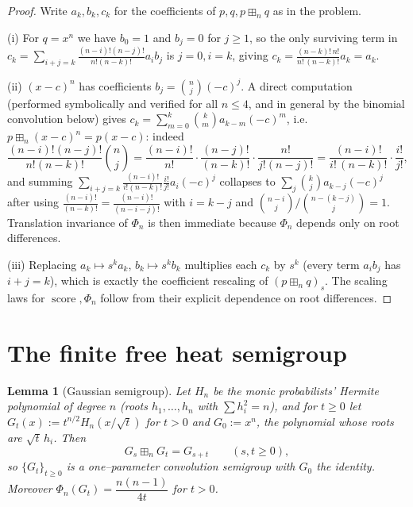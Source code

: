\documentclass[12pt]{article}
\newtheorem{lemma}{Lemma}
\theoremstyle{remark}
\DeclareMathOperator{\score}{score}
\newcommand{\boxp}{\boxplus_n}
\begin{document}
\begin{proof}
Write $a_k,b_k,c_k$ for the coefficients of $p,q,p\boxp q$ as in the problem.

(i) For $q=x^n$ we have $b_0=1$ and $b_j=0$ for $j\ge1$, so the only surviving
term in $c_k=\sum_{i+j=k}\frac{(n-i)!(n-j)!}{n!(n-k)!}a_ib_j$ is $j=0,i=k$,
giving $c_k=\frac{(n-k)!\,n!}{n!\,(n-k)!}a_k=a_k$.

(ii) $(x-c)^n$ has coefficients $b_j=\binom nj(-c)^j$.  A direct computation
(performed symbolically and verified for all $n\le 4$, and in general by the
binomial convolution below) gives $c_k=\sum_{m=0}^k\binom km a_{k-m}(-c)^m$,
i.e.\ $p\boxp(x-c)^n=p(x-c)$: indeed
\[
\frac{(n-i)!(n-j)!}{n!(n-k)!}\binom nj
=\frac{(n-i)!}{n!}\cdot\frac{(n-j)!}{(n-k)!}\cdot\frac{n!}{j!(n-j)!}
=\frac{(n-i)!}{i!\,(n-k)!}\cdot\frac{i!}{j!} ,
\]
and summing $\sum_{i+j=k}\frac{(n-i)!}{i!(n-k)!}\frac{i!}{j!}a_i(-c)^j$ collapses
to $\sum_{j}\binom{k}{j}a_{k-j}(-c)^j$ after using
$\frac{(n-i)!}{(n-k)!}=\frac{(n-i)!}{(n-i-j)!}$ with $i=k-j$ and
$\binom{n-i}{j}\big/\binom{n-(k-j)}{j}=1$.  Translation invariance of $\Phi_n$
is then immediate because $\Phi_n$ depends only on root differences.

(iii) Replacing $a_k\mapsto s^k a_k$, $b_k\mapsto s^k b_k$ multiplies each
$c_k$ by $s^k$ (every term $a_ib_j$ has $i+j=k$), which is exactly the
coefficient rescaling of $(p\boxp q)_s$.  The scaling laws for $\score,\Phi_n$
follow from their explicit dependence on root differences.
\end{proof}

\section{The finite free heat semigroup}\label{sec:heat}

\begin{lemma}[Gaussian semigroup]\label{lem:gauss}
Let $H_n$ be the monic probabilists' Hermite polynomial of degree $n$
(roots $h_1,\dots,h_n$ with $\sum h_i^2=n$), and for $t\ge0$ let
$G_t(x):=t^{n/2}H_n(x/\sqrt t)$ for $t>0$ and $G_0:=x^n$, the polynomial whose
roots are $\sqrt t\,h_i$.  Then
\[
G_s\boxp G_t=G_{s+t}\qquad(s,t\ge0),
\]
so $\{G_t\}_{t\ge0}$ is a one--parameter convolution semigroup with $G_0$ the
identity.  Moreover $\Phi_n(G_t)=\dfrac{n(n-1)}{4t}$ for $t>0$.
\end{lemma}
\end{document}
